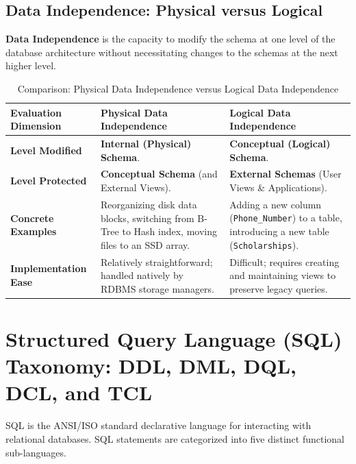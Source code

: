 \subsection{Data Independence: Physical versus Logical}

\textbf{Data Independence} is the capacity to modify the schema at one level of the database architecture without necessitating changes to the schemas at the next higher level.

\begin{table}[htbp]
\centering
\caption{Comparison: Physical Data Independence versus Logical Data Independence}
\label{tab:data_independence_comparison}
\begin{tabularx}{\textwidth}{p{3.2cm} X X}
\toprule
\textbf{Evaluation Dimension} & \textbf{Physical Data Independence} & \textbf{Logical Data Independence} \\
\midrule
\textbf{Level Modified} & \textbf{Internal (Physical) Schema}. & \textbf{Conceptual (Logical) Schema}. \\
\textbf{Level Protected} & \textbf{Conceptual Schema} (and External Views). & \textbf{External Schemas} (User Views \& Applications). \\
\textbf{Concrete Examples} & Reorganizing disk data blocks, switching from B-Tree to Hash index, moving files to an SSD array. & Adding a new column (\texttt{Phone\_Number}) to a table, introducing a new table (\texttt{Scholarships}). \\
\textbf{Implementation Ease} & Relatively straightforward; handled natively by RDBMS storage managers. & Difficult; requires creating and maintaining views to preserve legacy queries. \\
\bottomrule
\end{tabularx}
\end{table}

\newpage
\section{Structured Query Language (SQL) Taxonomy: DDL, DML, DQL, DCL, and TCL}

SQL is the ANSI/ISO standard declarative language for interacting with relational databases. SQL statements are categorized into five distinct functional sub-languages.


